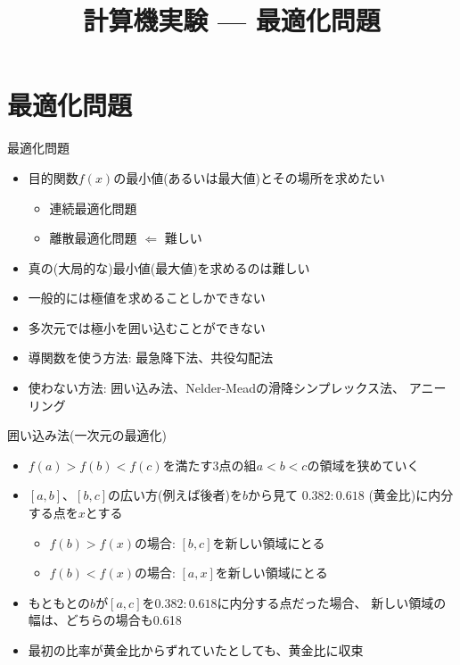 \documentclass[dvipdfmx]{beamer}
\title{計算機実験 --- 最適化問題}
\begin{document}

\begin{frame}
  \titlepage
  \tableofcontents
\end{frame}

\section{最適化問題}

\begin{frame}[t,fragile]{最適化問題}
  \begin{itemize}
    \setlength{\itemsep}{1em}
  \item 目的関数$f(x)$の最小値(あるいは最大値)とその場所を求めたい
    \begin{itemize}
    \item 連続最適化問題
    \item 離散最適化問題 $\Leftarrow$ 難しい
    \end{itemize}
  \item 真の(大局的な)最小値(最大値)を求めるのは難しい
  \item 一般的には極値を求めることしかできない
  \item 多次元では極小を囲い込むことができない
  \item 導関数を使う方法: 最急降下法、共役勾配法
  \item 使わない方法: 囲い込み法、Nelder-Meadの滑降シンプレックス法、
    アニーリング
  \end{itemize}
\end{frame}

\begin{frame}[t,fragile]{囲い込み法(一次元の最適化)}
  \begin{itemize}
    \setlength{\itemsep}{1em}
  \item $f(a) > f(b) < f(c)$を満たす3点の組$a < b < c$の領域を狭めていく
  \item $[a,b]$、$[b,c]$の広い方(例えば後者)を$b$から見て
    $0.382:0.618$ (黄金比)に内分する点を$x$とする
    \begin{itemize}
    \item $f(b) > f(x)$の場合: $[b,c]$を新しい領域にとる
    \item $f(b) < f(x)$の場合: $[a,x]$を新しい領域にとる
    \end{itemize}
  \item もともとの$b$が$[a,c]$を$0.382:0.618$に内分する点だった場合、
    新しい領域の幅は、どちらの場合も0.618
  \item 最初の比率が黄金比からずれていたとしても、黄金比に収束
  \end{itemize}
\end{frame}
\end{document}
